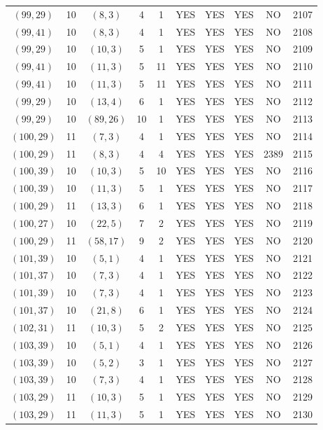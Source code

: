 \begin{longtable}{|c|c|c|c|c|c|c|c|c|c|}
$(99, 29)$ & 10 & $(8, 3)$ & 4 & 1 & YES & YES & YES & NO & 2107\\
$(99, 41)$ & 10 & $(8, 3)$ & 4 & 1 & YES & YES & YES & NO & 2108\\
$(99, 29)$ & 10 & $(10, 3)$ & 5 & 1 & YES & YES & YES & NO & 2109\\
$(99, 41)$ & 10 & $(11, 3)$ & 5 & 11 & YES & YES & YES & NO & 2110\\
$(99, 41)$ & 10 & $(11, 3)$ & 5 & 11 & YES & YES & YES & NO & 2111\\
$(99, 29)$ & 10 & $(13, 4)$ & 6 & 1 & YES & YES & YES & NO & 2112\\
$(99, 29)$ & 10 & $(89, 26)$ & 10 & 1 & YES & YES & YES & NO & 2113\\
$(100, 29)$ & 11 & $(7, 3)$ & 4 & 1 & YES & YES & YES & NO & 2114\\
$(100, 29)$ & 11 & $(8, 3)$ & 4 & 4 & YES & YES & YES & 2389 & 2115\\
$(100, 39)$ & 10 & $(10, 3)$ & 5 & 10 & YES & YES & YES & NO & 2116\\
$(100, 39)$ & 10 & $(11, 3)$ & 5 & 1 & YES & YES & YES & NO & 2117\\
$(100, 29)$ & 11 & $(13, 3)$ & 6 & 1 & YES & YES & YES & NO & 2118\\
$(100, 27)$ & 10 & $(22, 5)$ & 7 & 2 & YES & YES & YES & NO & 2119\\
$(100, 29)$ & 11 & $(58, 17)$ & 9 & 2 & YES & YES & YES & NO & 2120\\
$(101, 39)$ & 10 & $(5, 1)$ & 4 & 1 & YES & YES & YES & NO & 2121\\
$(101, 37)$ & 10 & $(7, 3)$ & 4 & 1 & YES & YES & YES & NO & 2122\\
$(101, 39)$ & 10 & $(7, 3)$ & 4 & 1 & YES & YES & YES & NO & 2123\\
$(101, 37)$ & 10 & $(21, 8)$ & 6 & 1 & YES & YES & YES & NO & 2124\\
$(102, 31)$ & 11 & $(10, 3)$ & 5 & 2 & YES & YES & YES & NO & 2125\\
$(103, 39)$ & 10 & $(5, 1)$ & 4 & 1 & YES & YES & YES & NO & 2126\\
$(103, 39)$ & 10 & $(5, 2)$ & 3 & 1 & YES & YES & YES & NO & 2127\\
$(103, 39)$ & 10 & $(7, 3)$ & 4 & 1 & YES & YES & YES & NO & 2128\\
$(103, 29)$ & 11 & $(10, 3)$ & 5 & 1 & YES & YES & YES & NO & 2129\\
$(103, 29)$ & 11 & $(11, 3)$ & 5 & 1 & YES & YES & YES & NO & 2130\\

\end{longtable}
